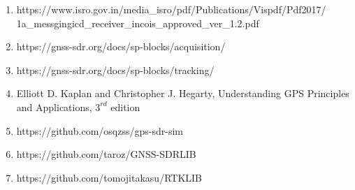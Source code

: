 \begin{enumerate}

	\item https://www.isro.gov.in/media\_isro/pdf/Publications/Vispdf/Pdf2017/\\1a\_messgingicd\_receiver\_incois\_approved\_ver\_1.2.pdf

	\item https://gnss-sdr.org/docs/sp-blocks/acquisition/

	\item https://gnss-sdr.org/docs/sp-blocks/tracking/
   
	\item Elliott D. Kaplan and Christopher J. Hegarty,  Understanding {GPS} {P}rinciples and {A}pplications, $3^{rd}$ edition
	\item https://github.com/osqzss/gps-sdr-sim
	\item https://github.com/taroz/GNSS-SDRLIB
	\item https://github.com/tomojitakasu/RTKLIB
\end{enumerate}
\let\cleardoublepage\clearpage  %
